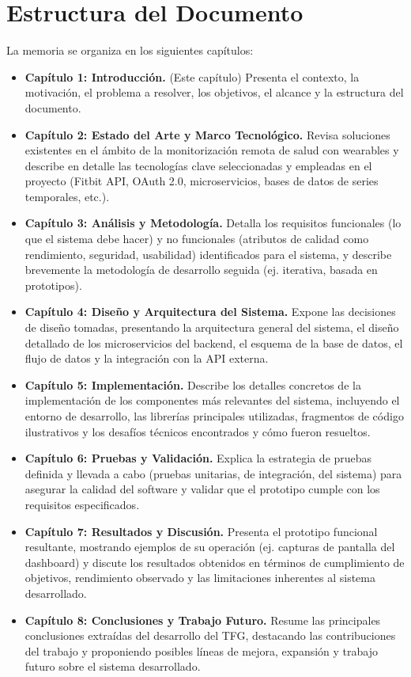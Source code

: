 \section{Estructura del Documento}
\label{sec:intro_estructura}

La memoria se organiza en los siguientes capítulos:

\begin{itemize}
    \item \textbf{Capítulo 1: Introducción.} (Este capítulo) Presenta el contexto, la motivación, el problema a resolver, los objetivos, el alcance y la estructura del documento.
    \item \textbf{Capítulo 2: Estado del Arte y Marco Tecnológico.} Revisa soluciones existentes en el ámbito de la monitorización remota de salud con wearables y describe en detalle las tecnologías clave seleccionadas y empleadas en el proyecto (Fitbit API, OAuth 2.0, microservicios, bases de datos de series temporales, etc.).
    \item \textbf{Capítulo 3: Análisis y Metodología.} Detalla los requisitos funcionales (lo que el sistema debe hacer) y no funcionales (atributos de calidad como rendimiento, seguridad, usabilidad) identificados para el sistema, y describe brevemente la metodología de desarrollo seguida (ej. iterativa, basada en prototipos).
    \item \textbf{Capítulo 4: Diseño y Arquitectura del Sistema.} Expone las decisiones de diseño tomadas, presentando la arquitectura general del sistema, el diseño detallado de los microservicios del backend, el esquema de la base de datos, el flujo de datos y la integración con la API externa.
    \item \textbf{Capítulo 5: Implementación.} Describe los detalles concretos de la implementación de los componentes más relevantes del sistema, incluyendo el entorno de desarrollo, las librerías principales utilizadas, fragmentos de código ilustrativos y los desafíos técnicos encontrados y cómo fueron resueltos.
    \item \textbf{Capítulo 6: Pruebas y Validación.} Explica la estrategia de pruebas definida y llevada a cabo (pruebas unitarias, de integración, del sistema) para asegurar la calidad del software y validar que el prototipo cumple con los requisitos especificados.
    \item \textbf{Capítulo 7: Resultados y Discusión.} Presenta el prototipo funcional resultante, mostrando ejemplos de su operación (ej. capturas de pantalla del dashboard) y discute los resultados obtenidos en términos de cumplimiento de objetivos, rendimiento observado y las limitaciones inherentes al sistema desarrollado.
    \item \textbf{Capítulo 8: Conclusiones y Trabajo Futuro.} Resume las principales conclusiones extraídas del desarrollo del TFG, destacando las contribuciones del trabajo y proponiendo posibles líneas de mejora, expansión y trabajo futuro sobre el sistema desarrollado.
\end{itemize}